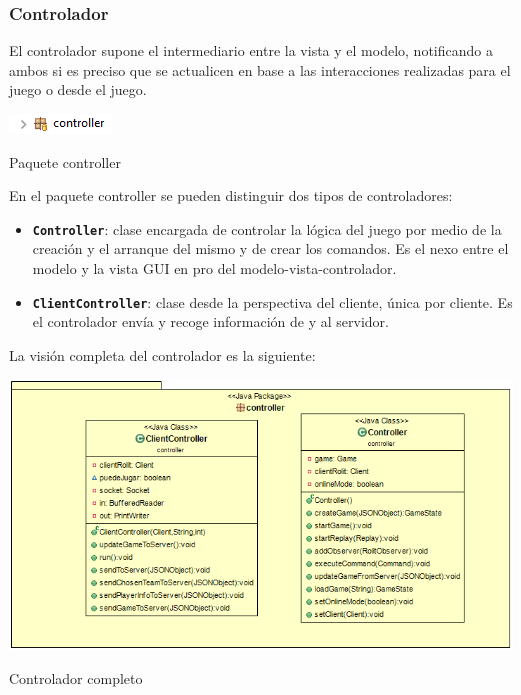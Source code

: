 \documentclass[../DocumentoOficial.tex]{subfiles}
\begin{document}
\newpage

\subsubsection{Controlador}

El controlador supone el intermediario entre la vista y el modelo, notificando a ambos si es preciso que se actualicen en base a las interacciones realizadas para el juego o desde el juego.

\begin{center}
\includegraphics[scale=2]{controllerpaquetes.png}

Paquete controller
\end{center}

En el paquete controller se pueden distinguir dos tipos de controladores:

\begin{itemize}

\item \texttt{\textbf{Controller}}: clase encargada de controlar la lógica del juego por medio de la creación y el arranque del mismo y de crear los comandos. Es el nexo entre el modelo y la vista GUI en pro del modelo-vista-controlador.

\item \texttt{\textbf{ClientController}}: clase desde la perspectiva del cliente, única por cliente. Es el controlador envía y recoge información de y al servidor.

\end{itemize}

La visión completa del controlador es la siguiente:

\begin{center}
\includegraphics[scale=0.8]{mvccontrolleruml.png}

Controlador completo
\end{center}
\end{document}
